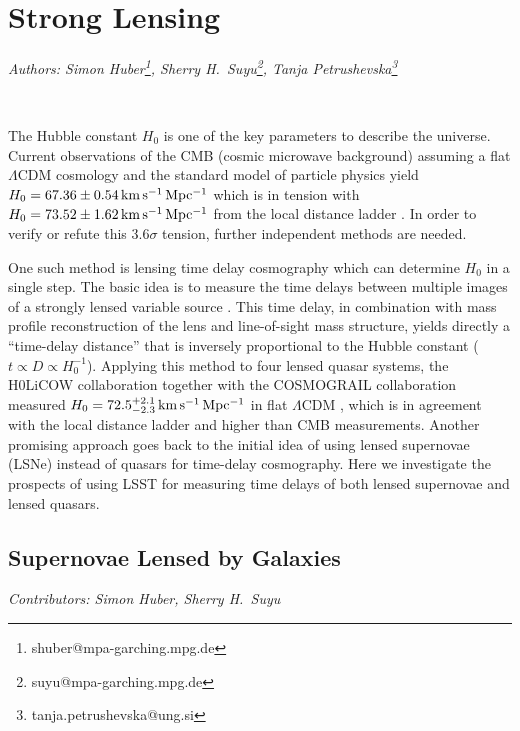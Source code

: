 


\section{Strong Lensing}
\textit{Authors: Simon Huber\footnote{shuber@mpa-garching.mpg.de}, Sherry H.~Suyu\footnote{suyu@mpa-garching.mpg.de}, Tanja Petrushevska\footnote{tanja.petrushevska@ung.si} }

\

The Hubble constant $H_0$ is one of the key parameters to describe the
universe. Current observations of the CMB (cosmic microwave
background) assuming a flat $\Lambda$CDM cosmology and the standard
model of particle physics yield $H_0 = 67.36 \pm 0.54 \, {\rm km\,s^{-1}\,Mpc^{-1}}$
\citep{Planck:2018vks} which is in tension with $H_0 =
73.52 \pm
  1.62 \, {\rm km\,s^{-1}\,Mpc^{-1}}$ from the local distance ladder
\citep{Riess:2016jrr,Riess:2018byc}. In order to verify or refute this
$3.6 \sigma$ tension, further independent methods are needed. 

One such method is lensing time delay cosmography which can determine
$H_0$ in a single step. The basic idea is to measure the time delays
between multiple images of a strongly lensed variable source
\citep{Refsdal:1964}. This time delay, in combination with mass
profile reconstruction of the lens and line-of-sight mass structure,
yields directly a ``time-delay distance'' that is inversely
proportional to the Hubble constant ($t \propto D \propto
H_0^{-1}$). Applying this method to four lensed quasar systems, the
H0LiCOW collaboration \citep{Suyu:2016qxx} together with the
COSMOGRAIL collaboration
\citep[e.g.]{Eigenbrod:2005ie,2013Tewes,2017Courbin} measured $H_0 =
72.5^{+2.1}_{-2.3} \,{\rm km\,s^{-1}\,Mpc^{-1}}$ in flat
$\Lambda$CDM \citep{Birrer:2018vtm}, which is in agreement with the
local distance ladder and higher than CMB measurements.  Another
promising approach goes back to the initial idea of
\cite{Refsdal:1964} using lensed supernovae (LSNe) instead of quasars
for time-delay cosmography. Here we investigate the prospects of using
LSST for measuring time delays of both lensed supernovae and lensed
quasars.

\subsection{Supernovae Lensed by Galaxies}
\textit{Contributors: Simon Huber, Sherry H.~Suyu}

